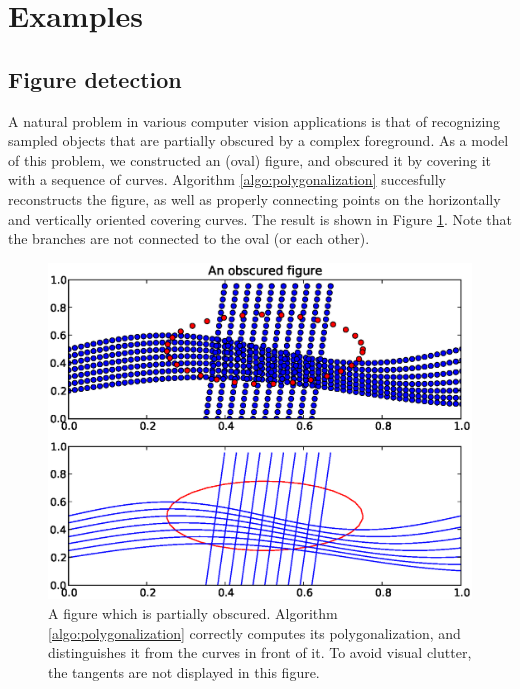 \documentclass{article}
\numberwithin{cntr}{section}
\numberwithin{equation}{section}
\begin{document}
\section{Examples}

\subsection{Figure detection}

A natural problem in various computer vision applications is that of
recognizing sampled objects that are partially obscured by a
complex foreground.
As a model of this problem, we constructed an (oval)
figure, and obscured it by covering it with a sequence of curves.
Algorithm \ref{algo:polygonalization} succesfully reconstructs the
figure, as well as properly connecting points on the
horizontally and vertically oriented covering curves.
The result is shown in
Figure \ref{fig:obscuredExample}. Note that the branches are not
connected to the oval (or each other).

\begin{figure}
\setlength{\unitlength}{0.240900pt}
\ifx\plotpoint\undefined\newsavebox{\plotpoint}\fi
\sbox{\plotpoint}{\rule[-0.200pt]{0.400pt}{0.400pt}}%
\includegraphics[scale=0.5]{obscured_figure.eps}
\caption{A figure which is partially obscured.
Algorithm \ref{algo:polygonalization} correctly computes its
polygonalization, and distinguishes it from the curves in front of it.
To avoid visual clutter, the tangents are not displayed in this figure.}
\label{fig:obscuredExample}
\end{figure}
\end{document}

